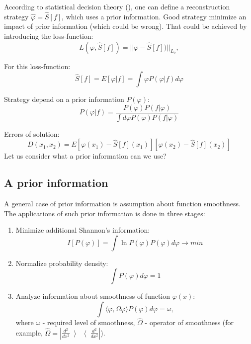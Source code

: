 \documentclass{webofc}
\begin{document}
According to statistical decision theory (\cite{james2006statistical}), one can define a reconstruction strategy  $\hat{\varphi} = \hat{S}[f]$, which uses a prior information. Good strategy minimize an impact of prior information (which could be wrong). That could be achieved by introducing the loss-function:
\begin{equation*}
	L(\varphi,\hat{S}[f]) = ||\varphi-\hat{S}[f])||_{L_2},
\end{equation*}

For this loss-function:
\begin{equation}
	\label{eq:opt}
	\hat{S}[f] = E[\varphi|f] = \int \varphi P(\varphi|f)d\varphi
\end{equation}

Strategy depend on a prior information $P(\varphi)$:
\begin{equation*}
	P(\varphi|f)= \frac{P(\varphi)P(f|\varphi)}{\int d\varphi P(\varphi)P(f|\varphi)} 
\end{equation*}

Errors of solution:
\begin{equation*}
	D(x_1,x_2)  = E[\varphi(x_1) - \hat{S}[f](x_1)][\varphi(x_2) - \hat{S}[f](x_2)]
\end{equation*}
Let us consider what a prior information can we use? 

\subsection{A prior information}\label{sec:theory:aprior}

A general case of prior information is assumption about function smoothness. The applications of such prior information is done in three stages:
\begin{enumerate}
\item Minimize additional Shannon's information:
	\begin{equation*}
		I[P(\varphi)] = \int \ln{P(\varphi)} P(\varphi) d\varphi \to min
	\end{equation*}
\item Normalize probability density:
	\begin{equation*}
		\int P(\varphi) d\varphi = 1
	\end{equation*}   
\item Analyze information about smoothness of function $\varphi(x)$:
	\begin{equation}
		\label{eq-smoothness}
		\int \langle \varphi,\hat{\Omega}\varphi \rangle P(\varphi) d\varphi = \omega,
	\end{equation}
where $\omega$ - required level of smoothness,   $\hat{\Omega}$ - operator of smoothness (for example, $\hat{\Omega}=|\frac{d^2}{dx^2}\left\rangle\right\langle\frac{d^2}{dx^2}|$).
\end{enumerate}
\end{document}
